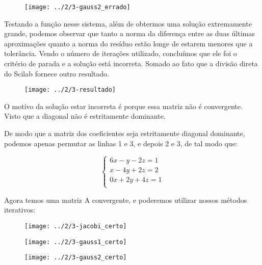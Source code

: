 \documentclass[leqno]{article}
\numberwithin{equation}{section}
\begin{document}
\begin{enumerate}
\begin{sol}
			\begin{figure}[H]
				\centering
				\texttt{[image: ../2/3-gauss2\_errado]}
			\end{figure}
			
			Testando a função nesse sistema, além de obtermos uma solução extremamente grande, podemos observar que tanto a norma da diferença entre as duas últimas aproximações quanto a norma do resíduo estão longe de estarem menores que a tolerância. Vendo o número de iterações utilizado, concluímos que ele foi o critério de parada e a solução está incorreta. Somado ao fato que a divisão direta do Scilab fornece outro resultado. 
			
			\begin{figure}[H]
				\centering
				\texttt{[image: ../2/3-resultado]}
				
			\end{figure}
			
			O motivo da solução estar incorreta é porque essa matriz não é convergente. Visto que a diagonal não é estritamente dominante.
			
			De modo que a matriz dos coeficientes seja estritamente diagonal dominante, podemos apenas permutar as linhas 1 e 3, e depois 2 e 3, de tal modo que:
			
			\begin{equation}
				\left\{\begin{split}
					6x - y - 2z = 1 \\
					x - 4y + 2z = 2 \\
					0x + 2y + 4z = 1 \\
				\end{split}\right.
			\end{equation}
		
			Agora temos uma matriz A convergente, e poderemos utilizar nossos métodos iterativos:
			
			\begin{figure}[H]
				\centering
				\texttt{[image: ../2/3-jacobi\_certo]}

			\end{figure}			
			
			\begin{figure}[H]
				\centering
				\texttt{[image: ../2/3-gauss1\_certo]}
			\end{figure}
			
			\begin{figure}[H]
				\centering
				\texttt{[image: ../2/3-gauss2\_certo]}
			\end{figure}
		

\end{sol}
\end{enumerate}
\end{document}

